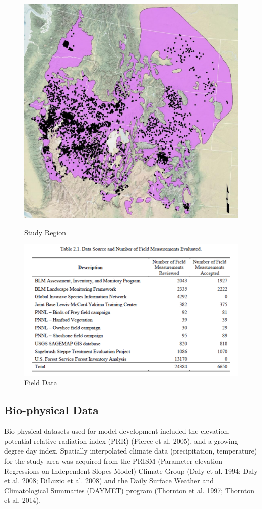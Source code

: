 \def\year{2017}\relax \documentclass[letterpaper]{article}
\begin{document}
\begin{figure}
\centering
\begin{minipage}{.5\textwidth}
  \centering
  \includegraphics[width=\textwidth]{pics/studyarea.png}
 \caption{Study Region}\label{fig:studyarea}
\end{minipage}%
\begin{minipage}{.5\textwidth}
  \centering
  \includegraphics[width=\textwidth]{pics/fielddata.png}
\caption{Field Data}\label{fig:field}
\end{minipage}
\end{figure}
\subsection{Bio-physical Data}
Bio-physical datasets used for model development included the elevation, potential relative radiation index (PRR) (Pierce et al. 2005), and a growing degree day index.
Spatially interpolated climate data (precipitation, temperature) for the study area was acquired from the PRISM (Parameter-elevation Regressions on Independent Slopes Model) Climate Group (Daly et al. 1994; Daly et al. 2008; DiLuzio et al. 2008) and the Daily Surface Weather and Climatological Summaries (DAYMET) program (Thornton et al. 1997; Thornton et al. 2014). 
\end{document}
